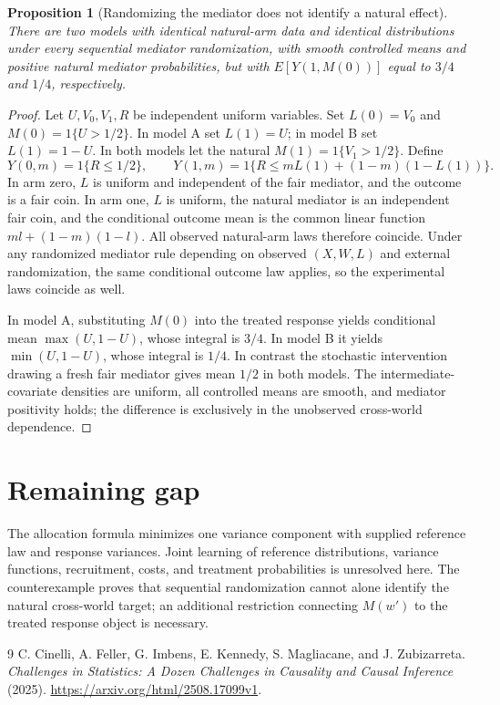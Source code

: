 \documentclass[11pt]{article}
\newtheorem{proposition}[theorem]{Proposition}
\theoremstyle{remark}
\begin{document}
\begin{proposition}[Randomizing the mediator does not identify a natural effect]
There are two models with identical natural-arm data and identical distributions under every sequential mediator randomization, with smooth controlled means and positive natural mediator probabilities, but with
$E[Y(1,M(0))]$ equal to $3/4$ and $1/4$, respectively.
\end{proposition}
\begin{proof}
Let $U,V_0,V_1,R$ be independent uniform variables. Set $L(0)=V_0$ and $M(0)=1\{U>1/2\}$. In model A set $L(1)=U$; in model B set $L(1)=1-U$. In both models let the natural $M(1)=1\{V_1>1/2\}$. Define
\[
 Y(0,m)=1\{R\le1/2\},\qquad
 Y(1,m)=1\{R\le mL(1)+(1-m)(1-L(1))\}.
\]
In arm zero, $L$ is uniform and independent of the fair mediator, and the outcome is a fair coin. In arm one, $L$ is uniform, the natural mediator is an independent fair coin, and the conditional outcome mean is the common linear function $ml+(1-m)(1-l)$. All observed natural-arm laws therefore coincide. Under any randomized mediator rule depending on observed $(X,W,L)$ and external randomization, the same conditional outcome law applies, so the experimental laws coincide as well.

In model A, substituting $M(0)$ into the treated response yields conditional mean $\max(U,1-U)$, whose integral is $3/4$. In model B it yields $\min(U,1-U)$, whose integral is $1/4$. In contrast the stochastic intervention drawing a fresh fair mediator gives mean $1/2$ in both models. The intermediate-covariate densities are uniform, all controlled means are smooth, and mediator positivity holds; the difference is exclusively in the unobserved cross-world dependence.
\end{proof}

\section*{Remaining gap}
The allocation formula minimizes one variance component with supplied reference law and response variances. Joint learning of reference distributions, variance functions, recruitment, costs, and treatment probabilities is unresolved here. The counterexample proves that sequential randomization cannot alone identify the natural cross-world target; an additional restriction connecting $M(w')$ to the treated response object is necessary.

\begin{thebibliography}{9}
 C. Cinelli, A. Feller, G. Imbens, E. Kennedy, S. Magliacane, and J. Zubizarreta. \emph{Challenges in Statistics: A Dozen Challenges in Causality and Causal Inference} (2025). \url{https://arxiv.org/html/2508.17099v1}.
\end{thebibliography}
\end{document}
